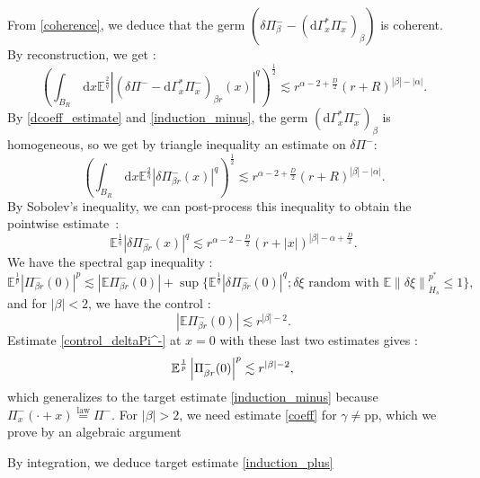 \documentclass[12pt, a4paper]{article}
\newcommand{\E}{\mathbb{E}}
\newcommand{\dG}{\mathrm{d}\Gamma^*_x}
\newcommand{\abs}[1]{\left| #1 \right|}
\newcommand{\norm}[1]{\left\| #1 \right\|}
\newcommand{\dd}{\,\mathrm{d}}
\begin{document}
From \eqref{coherence}, we deduce that the germ $(\delta \Pi_\beta^- - (\dG \Pi_x^-)_\beta)$ is coherent. By reconstruction, we get :
\begin{equation}
        (\int_{B_R} \dd x \mathbb{E}^{\frac{2}{q}}\abs{(\delta \Pi^- - \dG \Pi_x^-)_{\beta r}(x)}^q)^\frac{1}{2} \lesssim r^{\alpha - 2 + \frac{D}{2}}(r+R)^{\abs{\beta} - \abs{\alpha}}. \label{reconstruction}
\end{equation}
By \eqref{dcoeff_estimate} and \eqref{induction_minus}, the germ $(\dG \Pi_x^-)_\beta$ is homogeneous, so we get by triangle inequality an estimate on $\delta \Pi^-$:
\begin{equation*}
        (\int_{B_R} \dd x \mathbb{E}^{\frac{2}{q}}\abs{\delta \Pi^-_{\beta r}(x)}^q)^\frac{1}{2} \lesssim r^{\alpha - 2 + \frac{D}{2}}(r+R)^{\abs{\beta} - \abs{\alpha}}.
\end{equation*}
By Sobolev's inequality, we can post-process this inequality to obtain the pointwise estimate~:
\begin{equation}
    \label{control_deltaPi^-}
    \E^{\frac{1}{q}} \abs{\delta \Pi^-_{\beta r}(x)}^q \lesssim r^{\alpha - 2 - \frac{D}{2}}(r+\abs{x})^{\abs{\beta}-\alpha + \frac{D}{2}}.
\end{equation}
We have the spectral gap inequality :
\begin{equation}
        \E^{\frac{1}{p}} \abs{\Pi^-_{\beta r}(0)}^p \lesssim \abs{\E \Pi^-_{\beta r}(0)} 
        + \sup \{\E^{\frac{1}{q}} \abs{\delta \Pi^-_{\beta r}(0)}^q ; \delta \xi \text{ random with }\E \norm{\delta \xi}^{p^*}_{\dot{H}_s} \leq 1\},
\end{equation}
and for $\abs{\beta}<2$, we have the control :
$$
\abs{\E \Pi^-_{\beta r}(0)}  \lesssim r^{\abs{\beta}-2}.
$$
Estimate \eqref{control_deltaPi^-} at $x=0$ with these last two estimates gives :
\begin{equation}
    \E^{\frac{1}{p}} \abs{\Pi_{\beta r}^-(0)}^p \lesssim r^{\abs{\beta}-2}, \\
\end{equation}
which generalizes to the target estimate \eqref{induction_minus} because $\Pi_x^- (\cdot + x)\overset{\mathrm{law}}{=}\Pi^-$.
For $\abs{\beta}>2$,
we need estimate \eqref{coeff} for $\gamma \neq $pp, which we prove by an algebraic argument





By integration, we deduce target estimate \eqref{induction_plus}
\end{document}
